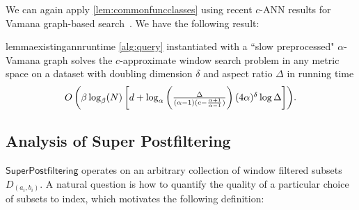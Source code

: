 \documentclass{article}
\theoremstyle{plain}
\theoremstyle{definition}
\theoremstyle{remark}
\newcommand{\shangdi}[1]{{\color{blue}{\bf Shangdi:} #1}}
\newcommand{\julian}[1]{{\color{red}{\bf Julian:} #1}}
\newcommand{\josh}[1]{{\color{orange}{\bf Josh:} #1}}
\newcommand{\laxman}[1]{{\color{teal}{\bf Laxman:} #1}}
\newcommand{\algname}[1]{\ensuremath{\mathsf{#1}}}
\newcommand*{\Resize}[2]{\resizebox{#1}{!}{$#2$}}%
\begin{document}
We can again apply \cref{lem:commonfuncclasses} using recent $c$-ANN results for Vamana graph-based search~\cite{indyk2023worst}. 
We have the following result:
\begin{restatable}{lemma}{existingannruntime}
\label{lem:existingannruntime}
\cref{alg:query} instantiated with a ``slow preprocessed" $\alpha$-Vamana graph solves the $c$-approximate window search problem in any metric space on a dataset with doubling dimension $\delta$ and aspect ratio $\Delta$ in running time
$$\Resize{8.3cm}{O\left(\beta\log_\beta(N)\left[d + \log_\alpha\left(\frac{\Delta}{(\alpha - 1 )(c - \frac{\alpha + 1}{\alpha - 1})}\right)(4\alpha)^{\delta} \log \Delta\right]\right)}.$$
\end{restatable}


\subsection{Analysis of Super Postfiltering}

\algname{Super Postfiltering} operates on an arbitrary collection of window filtered subsets $D_{(a_i, b_i)}$. A natural question is how to quantify the quality of a particular choice of subsets to index, which motivates the following definition:

\end{document}
